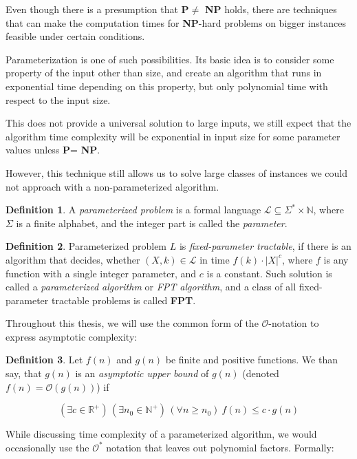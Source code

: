\documentclass[thesis=M,english,hidelinks]{FITthesis}[2012/10/20]
\theoremstyle{definition}
\newtheorem{definition}{Definition}
\newcommand{\PC}{\textbf{P}\xspace}
\newcommand{\NP}{\textbf{NP}\xspace}
\newcommand{\NPH}{\textbf{NP}-hard\xspace}
\begin{document}
Even though there is a presumption that \PC $\neq$ \NP holds, there are techniques that can make the computation
times for \NPH problems on bigger instances feasible under certain conditions.

Parameterization is one of such possibilities. Its basic idea is to consider some property of the input other than size,
and create an algorithm that runs in exponential time depending on this property, but only polynomial time with respect
to the input size.

This does not provide a universal solution to large inputs, we still expect that the algorithm time complexity will be
exponential in input size for some parameter values unless \PC = \NP.

However, this technique still allows us to solve large classes of instances we could not approach with a
non-parameterized algorithm.

\begin{definition}
    A \emph{parameterized problem} is a formal language $\mathcal{L} \subseteq \Sigma^* \times \mathbb{N}$, where $\Sigma$ is
    a finite alphabet, and the integer part is called the \emph{parameter}.
\end{definition}

\begin{definition}
    Parameterized problem $L$ is \emph{fixed-parameter tractable}, if there is an algorithm that decides, whether $(X, k)
    \in \mathcal{L}$ in time $f(k) \cdot \lvert X \rvert^c$, where $f$ is any function with a single integer parameter,
    and $c$ is a constant. Such solution is called a \emph{parameterized algorithm} or \emph{FPT algorithm}, and a class
    of all fixed-parameter tractable problems is called \textbf{FPT}.
\end{definition}

Throughout this thesis, we will use the common form of the $\mathcal{O}$-notation to express asymptotic complexity:

\begin{definition}
    Let $f(n)$ and $g(n)$ be finite and positive functions. We than say, that $g(n)$ is an \emph{asymptotic upper bound}
    of $g(n)$ (denoted $f(n) = \mathcal{O}(g(n))$) if

    $$
    (\exists c \in \mathbb{R}^+)\,(\exists n_0 \in \mathbb{N}^+)\,(\forall n \geq n_0)\ f(n) \leq c \cdot g(n)
    $$
\end{definition}

While discussing time complexity of a parameterized algorithm, we would occasionally use the $\mathcal{O}^*$ notation that
leaves out polynomial factors. Formally:
\end{document}
